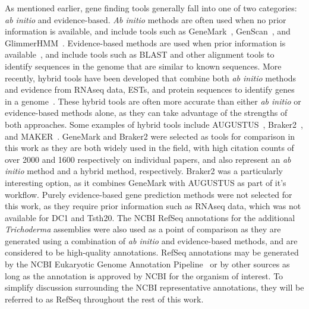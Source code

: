 As mentioned earlier, gene finding tools generally fall into one of two categories: \textit{ab initio} and evidence-based. \textit{Ab initio} methods are often used when no prior information is available, and include tools such as GeneMark~\cite{borodovsky2011a}, GenScan~\cite{burge1997}, and GlimmerHMM~\cite{majoros2004}. Evidence-based methods are used when prior information is available~\cite{ejigu2020a}, and include tools such as BLAST and other alignment tools to identify sequences in the genome that are similar to known sequences. More recently, hybrid tools have been developed that combine both \textit{ab initio} methods and evidence from RNAseq data, ESTs, and protein sequences to identify genes in a genome~\cite{ejigu2020a}. These hybrid tools are often more accurate than either \textit{ab initio} or evidence-based methods alone, as they can take advantage of the strengths of both approaches. Some examples of hybrid tools include AUGUSTUS~\cite{stanke2003}, Braker2~\cite{bruna2021a}, and MAKER~\cite{cantarel2008}. GeneMark and Braker2 were selected as tools for comparison in this work as they are both widely used in the field, with high citation counts of over 2000 and 1600 respectively on individual papers, and also represent an \textit{ab initio} method and a hybrid method, respectively. Braker2 was a particularly interesting option, as it combines GeneMark with AUGUSTUS as part of it's workflow. Purely evidence-based gene prediction methods were not selected for this work, as they require prior information such as RNAseq data, which was not available for DC1 and Tsth20. The NCBI RefSeq annotations for the additional \textit{Trichoderma} assemblies were also used as a point of comparison as they are generated using a combination of \textit{ab initio} and evidence-based methods, and are considered to be high-quality annotations. RefSeq annotations may be generated by the NCBI Eukaryotic Genome Annotation Pipeline~\cite{zotero-item-367} or by other sources as long as the annotation is approved by NCBI for the organism of interest. To simplify discussion surrounding the NCBI representative annotations, they will be referred to as RefSeq throughout the rest of this work.

